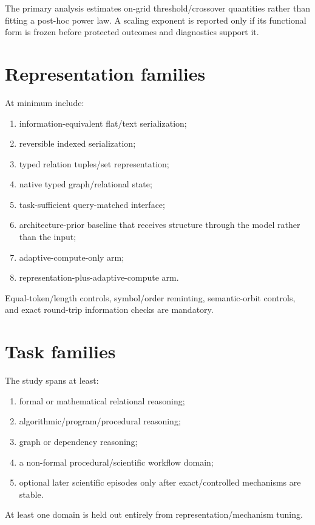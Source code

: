 \documentclass[11pt]{article}
\begin{document}
The primary analysis estimates on-grid threshold/crossover quantities rather than fitting a post-hoc power law. A scaling exponent is reported only if its functional form is frozen before protected outcomes and diagnostics support it.

\section{Representation families}
At minimum include:
\begin{enumerate}
    \item information-equivalent flat/text serialization;
    \item reversible indexed serialization;
    \item typed relation tuples/set representation;
    \item native typed graph/relational state;
    \item task-sufficient query-matched interface;
    \item architecture-prior baseline that receives structure through the model rather than the input;
    \item adaptive-compute-only arm;
    \item representation-plus-adaptive-compute arm.
\end{enumerate}

Equal-token/length controls, symbol/order reminting, semantic-orbit controls, and exact round-trip information checks are mandatory.

\section{Task families}
The study spans at least:
\begin{enumerate}
    \item formal or mathematical relational reasoning;
    \item algorithmic/program/procedural reasoning;
    \item graph or dependency reasoning;
    \item a non-formal procedural/scientific workflow domain;
    \item optional later scientific episodes only after exact/controlled mechanisms are stable.
\end{enumerate}
At least one domain is held out entirely from representation/mechanism tuning.
\end{document}
